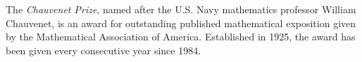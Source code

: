 \documentclass[12pt]{article}
\begin{document}
The {\em Chauvenet Prize}, named after the U.S. Navy mathematics professor William Chauvenet, is an award for outstanding published mathematical exposition given by the Mathematical Association of America. Established in 1925, the award has been given every consecutive year since 1984.
\end{document}
